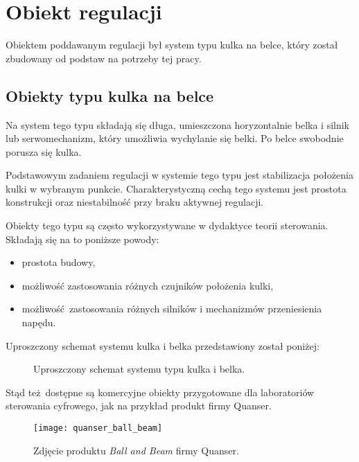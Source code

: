 \chapter{Obiekt regulacji}
\label{cha:ch2_obiekt_regulacji}

Obiektem poddawanym regulacji był system typu kulka na belce, który został zbudowany od podstaw na potrzeby tej pracy.

\section{Obiekty typu kulka na belce}

Na system tego typu składają się długa, umieszczona horyzontalnie belka i silnik lub serwomechanizm, który umożliwia wychylanie się belki.
Po belce swobodnie porusza się kulka.

Podstawowym zadaniem regulacji w systemie tego typu jest stabilizacja położenia kulki w wybranym punkcie.
Charakterystyczną cechą tego systemu jest prostota konstrukcji oraz niestabilność przy braku aktywnej regulacji.

Obiekty tego typu są często wykorzystywane w dydaktyce teorii sterowania. Składają się na to poniższe powody:

\begin{itemize}
	\item prostota budowy,
	\item możliwość zastosowania różnych czujników położenia kulki,
	\item możliwość zastosowania różnych silników i mechanizmów przeniesienia napędu.
\end{itemize}

Uproszczony schemat systemu kulka i belka przedstawiony został poniżej:

\begin{figure}[H]
	\centering
	
	\caption{Uproszczony schemat systemu typu kulka i belka.}
	\label{fig:kulka_belka_schemat_uproszczony}
\end{figure}

Stąd też dostępne są komercyjne obiekty przygotowane dla laboratoriów sterowania cyfrowego, jak na przykład produkt firmy Quanser.

\begin{figure}[H]
	\centering
	\texttt{[image: quanser\_ball\_beam]}
	\caption{Zdjęcie produktu \textit{Ball and Beam} firmy Quanser.}
	\label{fig:quanser_ball_beam}
\end{figure}

